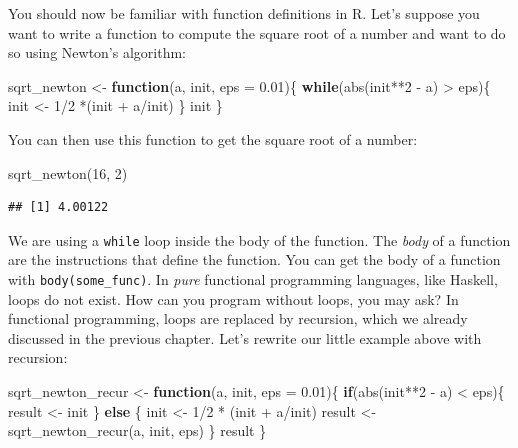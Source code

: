 \documentclass[
]{article}
\newenvironment{Shaded}{\begin{snugshade}}{\end{snugshade}}
\newcommand{\AttributeTok}[1]{\textcolor[rgb]{0.77,0.63,0.00}{#1}}
\newcommand{\ControlFlowTok}[1]{\textcolor[rgb]{0.13,0.29,0.53}{\textbf{#1}}}
\newcommand{\DecValTok}[1]{\textcolor[rgb]{0.00,0.00,0.81}{#1}}
\newcommand{\FloatTok}[1]{\textcolor[rgb]{0.00,0.00,0.81}{#1}}
\newcommand{\FunctionTok}[1]{\textcolor[rgb]{0.00,0.00,0.00}{#1}}
\newcommand{\NormalTok}[1]{#1}
\newcommand{\OtherTok}[1]{\textcolor[rgb]{0.56,0.35,0.01}{#1}}
\newcommand{\SpecialCharTok}[1]{\textcolor[rgb]{0.00,0.00,0.00}{#1}}
\begin{document}
You should now be familiar with function definitions in R. Let's suppose you want to write a function
to compute the square root of a number and want to do so using Newton's algorithm:

\begin{Shaded}
\begin{Highlighting}[]
\NormalTok{sqrt\_newton }\OtherTok{\textless{}{-}} \ControlFlowTok{function}\NormalTok{(a, init, }\AttributeTok{eps =} \FloatTok{0.01}\NormalTok{)\{}
    \ControlFlowTok{while}\NormalTok{(}\FunctionTok{abs}\NormalTok{(init}\SpecialCharTok{**}\DecValTok{2} \SpecialCharTok{{-}}\NormalTok{ a) }\SpecialCharTok{\textgreater{}}\NormalTok{ eps)\{}
\NormalTok{        init }\OtherTok{\textless{}{-}} \DecValTok{1}\SpecialCharTok{/}\DecValTok{2} \SpecialCharTok{*}\NormalTok{(init }\SpecialCharTok{+}\NormalTok{ a}\SpecialCharTok{/}\NormalTok{init)}
\NormalTok{    \}}
\NormalTok{    init}
\NormalTok{\}}
\end{Highlighting}
\end{Shaded}

You can then use this function to get the square root of a number:

\begin{Shaded}
\begin{Highlighting}[]
\FunctionTok{sqrt\_newton}\NormalTok{(}\DecValTok{16}\NormalTok{, }\DecValTok{2}\NormalTok{)}
\end{Highlighting}
\end{Shaded}

\begin{verbatim}
## [1] 4.00122
\end{verbatim}

We are using a \texttt{while} loop inside the body of the function. The \emph{body} of a function are the
instructions that define the function. You can get the body of a function with \texttt{body(some\_func)}.
In \emph{pure} functional programming languages, like Haskell, loops do not exist. How can you
program without loops, you may ask? In functional programming, loops are replaced by recursion,
which we already discussed in the previous chapter. Let's rewrite our little example above
with recursion:

\begin{Shaded}
\begin{Highlighting}[]
\NormalTok{sqrt\_newton\_recur }\OtherTok{\textless{}{-}} \ControlFlowTok{function}\NormalTok{(a, init, }\AttributeTok{eps =} \FloatTok{0.01}\NormalTok{)\{}
    \ControlFlowTok{if}\NormalTok{(}\FunctionTok{abs}\NormalTok{(init}\SpecialCharTok{**}\DecValTok{2} \SpecialCharTok{{-}}\NormalTok{ a) }\SpecialCharTok{\textless{}}\NormalTok{ eps)\{}
\NormalTok{        result }\OtherTok{\textless{}{-}}\NormalTok{ init}
\NormalTok{    \} }\ControlFlowTok{else}\NormalTok{ \{}
\NormalTok{        init }\OtherTok{\textless{}{-}} \DecValTok{1}\SpecialCharTok{/}\DecValTok{2} \SpecialCharTok{*}\NormalTok{ (init }\SpecialCharTok{+}\NormalTok{ a}\SpecialCharTok{/}\NormalTok{init)}
\NormalTok{        result }\OtherTok{\textless{}{-}} \FunctionTok{sqrt\_newton\_recur}\NormalTok{(a, init, eps)}
\NormalTok{    \}}
\NormalTok{    result}
\NormalTok{\}}
\end{Highlighting}
\end{Shaded}
\end{document}
